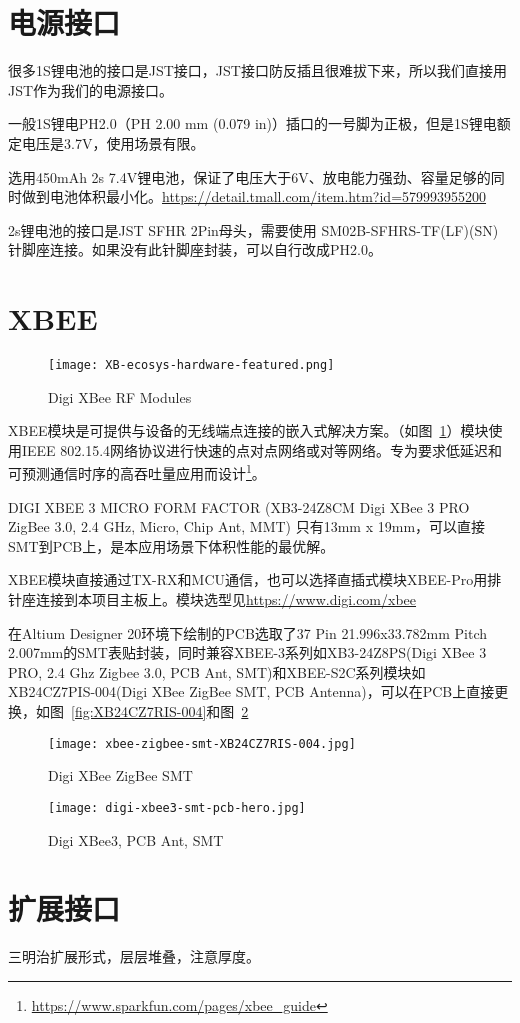\section{电源接口}

很多1S锂电池的接口是JST接口，JST接口防反插且很难拔下来，所以我们直接用JST作为我们的电源接口。

一般1S锂电PH2.0（PH 2.00 mm (0.079 in)）插口的一号脚为正极，但是1S锂电额定电压是3.7V，使用场景有限。

选用450mAh 2s 7.4V锂电池，保证了电压大于6V、放电能力强劲、容量足够的同时做到电池体积最小化。\url{https://detail.tmall.com/item.htm?id=579993955200}

2s锂电池的接口是JST SFHR 2Pin母头，需要使用 SM02B-SFHRS-TF(LF)(SN) 针脚座连接。如果没有此针脚座封装，可以自行改成PH2.0。


\section{XBEE}

\begin{figure}[htbp]
    \centering
    \texttt{[image: XB-ecosys-hardware-featured.png]}
    \caption{Digi XBee RF Modules}
    \label{fig:XB}
\end{figure}

XBEE模块是可提供与设备的无线端点连接的嵌入式解决方案。（如图~\ref{fig:XB}）模块使用IEEE 802.15.4网络协议进行快速的点对点网络或对等网络。专为要求低延迟和可预测通信时序的高吞吐量应用而设计\footnote{\url{https://www.sparkfun.com/pages/xbee_guide}}。

DIGI XBEE 3 MICRO FORM FACTOR (XB3-24Z8CM  Digi XBee 3 PRO ZigBee 3.0, 2.4 GHz, Micro, Chip Ant, MMT) 只有13mm x 19mm，可以直接SMT到PCB上，是本应用场景下体积性能的最优解。

XBEE模块直接通过TX-RX和MCU通信，也可以选择直插式模块XBEE-Pro用排针座连接到本项目主板上。模块选型见\url{https://www.digi.com/xbee}

在Altium Designer 20环境下绘制的PCB选取了37 Pin 21.996x33.782mm Pitch 2.007mm的SMT表贴封装，同时兼容XBEE-3系列如XB3-24Z8PS(Digi XBee 3 PRO, 2.4 Ghz Zigbee 3.0, PCB Ant, SMT)和XBEE-S2C系列模块如XB24CZ7PIS-004(Digi XBee ZigBee SMT, PCB Antenna)，可以在PCB上直接更换，如图~\ref{fig:XB24CZ7RIS-004}和图~\ref{fig:xbee3}

\begin{figure}
    \begin{minipage}{0.48\textwidth}
      \centering
      \texttt{[image: xbee-zigbee-smt-XB24CZ7RIS-004.jpg]}
      \caption{Digi XBee ZigBee SMT}
      \label{fig:XB24CZ7RIS-004}
    \end{minipage}\hfill
    \begin{minipage}{0.48\textwidth}
      \centering
      \texttt{[image: digi-xbee3-smt-pcb-hero.jpg]}
      \caption{Digi XBee3, PCB Ant, SMT}
      \label{fig:xbee3}
    \end{minipage}
\end{figure}

\section{扩展接口}

三明治扩展形式，层层堆叠，注意厚度。

